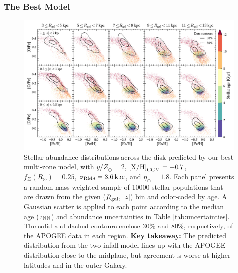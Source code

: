 \documentclass[twocolumn,twocolappendix,linenumbers]{aastex631}
\newcommand{\yZ}[1]{$y/Z_\odot=#1$}
\newcommand{\kpc}{\,{\rm kpc}}
\begin{document}
\subsubsection{The Best Model}
\label{sec:ofe-feh-best}

\begin{figure}
    \centering
    \includegraphics[width=\textwidth]{figures/ofe_feh_best.pdf}
    \caption{Stellar abundance distributions across the disk predicted by our best multi-zone model, with \yZ{2}, ${\rm [X/H]}_{\rm CGM}=-0.7$, $f_\Sigma(R_\odot)=0.25$, $\sigma_{\rm RM8}=3.6\kpc$, and $\eta_\odot=1.8$. Each panel presents a random mass-weighted sample of \num{10000} stellar populations that are drawn from the given ($R_{\rm gal}$, $|z|$) bin and color-coded by age. A Gaussian scatter is applied to each point according to the median age ($\tau_{\rm NN}$) and abundance uncertainties in Table \ref{tab:uncertainties}. The solid and dashed contours enclose 30\% and 80\%, respectively, of the APOGEE data in each region. {\bf Key takeaway:} The predicted distribution from the two-infall model lines up with the APOGEE distribution close to the midplane, but agreement is worse at higher latitudes and in the outer Galaxy.}
    \label{fig:ofe-feh-best}
\end{figure}
\end{document}
